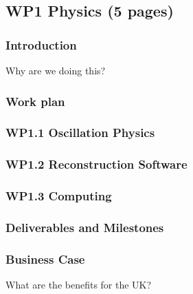 \subsection{WP1 Physics (5 pages)}

\subsubsection{Introduction}

Why are we doing this?

\subsubsection{Work plan}
\subsubsection{WP1.1 Oscillation Physics}
\subsubsection{WP1.2 Reconstruction Software}
\subsubsection{WP1.3 Computing}

\subsubsection{Deliverables and Milestones}

\subsubsection{Business Case}

What are the benefits for the UK?
